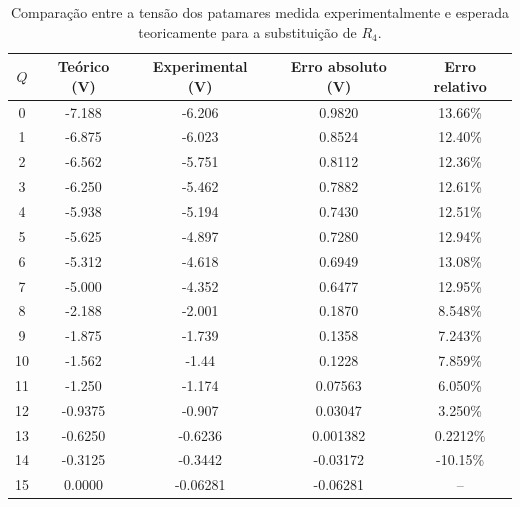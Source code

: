 \documentclass[a4paper, oneside]{article}
\begin{document}
\begin{table}[ht]
	\centering
	\caption{Comparação entre a tensão dos patamares medida experimentalmente e esperada teoricamente para a substituição de $R_4$.}
	\label{tab:Pat_R4_exp}
	\begin{tabular}{ccccc}
		$Q$ & Teórico (V) & Experimental (V) & Erro absoluto (V) & Erro relativo\\
		\hline
		0 & -7.188 & -6.206 & 0.9820 & 13.66\%\\ 
		1 & -6.875 & -6.023 & 0.8524 & 12.40\%\\ 
		2 & -6.562 & -5.751 & 0.8112 & 12.36\%\\ 
		3 & -6.250 & -5.462 & 0.7882 & 12.61\%\\ 
		4 & -5.938 & -5.194 & 0.7430 & 12.51\%\\ 
		5 & -5.625 & -4.897 & 0.7280 & 12.94\%\\ 
		6 & -5.312 & -4.618 & 0.6949 & 13.08\%\\ 
		7 & -5.000 & -4.352 & 0.6477 & 12.95\%\\ 
		8 & -2.188 & -2.001 & 0.1870 & 8.548\%\\ 
		9 & -1.875 & -1.739 & 0.1358 & 7.243\%\\ 
		10 & -1.562 & -1.44 & 0.1228 & 7.859\%\\ 
		11 & -1.250 & -1.174 & 0.07563 & 6.050\%\\ 
		12 & -0.9375 & -0.907 & 0.03047 & 3.250\%\\ 
		13 & -0.6250 & -0.6236 & 0.001382 & 0.2212\%\\ 
		14 & -0.3125 & -0.3442 & -0.03172 & -10.15\%\\ 
		15 & 0.0000 & -0.06281 & -0.06281 & --\\
	
		\hline
	\end{tabular}
\end{table}
\end{document}
